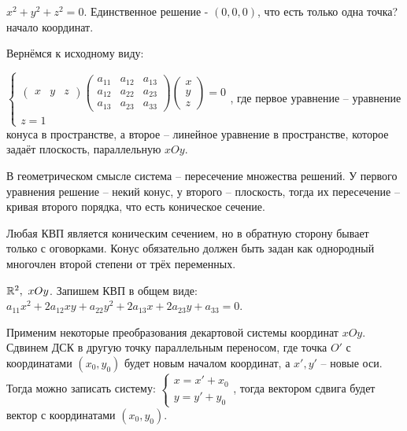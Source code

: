   \begin{Example}
    $x^2  + y^2 + z^2 = 0$. Единственное решение - $(0, 0, 0)$, что есть только одна точка? начало координат. 
  \end{Example}

  Вернёмся к исходному виду:

  $\begin{cases}
  \left( \begin{array}{cccc}
    x & y & z
    \end{array}\right)
  \left( \begin{array}{cccc}
    a_{11} & a_{12} & a_{13}\\
    a_{12} & a_{22} & a_{23} \\
    a_{13} & a_{23} & a_{33}
    \end{array}\right)
  \left( \begin{array}{cccc}
    x \\
    y \\
    z
    \end{array}\right) = 0 \\
  z = 1    
  \end{cases}$, где первое уравнение -- уравнение конуса в пространстве, а второе -- линейное уравнение в пространстве, которое задаёт плоскость, параллельную $xOy$.
  
  В геометрическом смысле система -- пересечение множества решений. У первого уравнения решение -- некий конус, у второго -- плоскость, тогда их пересечение -- кривая второго порядка, что есть коническое сечение.

  \begin{Rem}
    Любая КВП является коническим сечением, но в обратную сторону бывает только с оговорками. Конус обязательно должен быть задан как однородный многочлен второй степени от трёх переменных.
  \end{Rem}


  $\mathbb{R}^2, \ xOy$. Запишем КВП в общем виде: $a_{11} x^2 + 2 a_{12}xy + a_{22} y^2 + 2 a_{13}x + 2 a_{23}y + a_{33} = 0$.

  Применим некоторые преобразования декартовой системы координат $xOy$. Сдвинем ДСК в другую точку параллельным переносом, где точка $O'$ с координатами $(x_0, y_0)$ будет новым началом координат, а $x', y'$ -- новые оси.
  Тогда можно записать систему:
 $\begin{cases}
	x = x' + x_0 \\
	y = y' + y_0
 \end{cases}$, тогда вектором сдвига будет вектор с координатами $(x_0, y_0)$.

